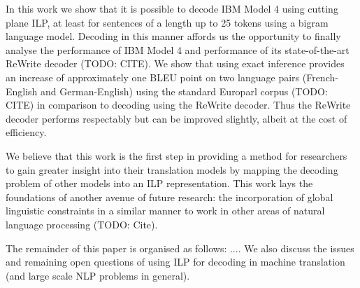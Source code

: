 In this work we show that it is possible to decode IBM Model 4 using
cutting plane ILP, at least for sentences of a length up to 25 tokens
using a bigram language model.  Decoding in this manner affords us the
opportunity to finally analyse the performance of IBM Model 4 and
performance of its state-of-the-art ReWrite decoder (TODO: CITE).  We
show that using exact inference provides an increase of approximately
one BLEU point on two language pairs (French-English and
German-English) using the standard Europarl corpus (TODO: CITE) in
comparison to decoding using the ReWrite decoder.  Thus the ReWrite
decoder performs respectably but can be improved slightly, albeit at
the cost of efficiency.

We believe that this work is the first step in providing a method for
researchers to gain greater insight into their translation models by
mapping the decoding problem of other models into an ILP
representation.  This work lays the foundations of another avenue of
future research: the incorporation of global linguistic constraints in
a similar manner to work in other areas of natural language
processing (TODO: Cite).

The remainder of this paper is organised as follows: ....  We also
discuss the issues and remaining open questions of using ILP for
decoding in machine translation (and large scale NLP problems in
general).



